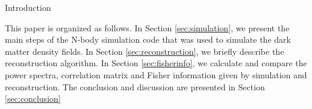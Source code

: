 \begin{section}{Introduction}

  This paper is organized as follows. 
  In Section \ref{sec:simulation}, we present the main steps of the N-body simulation code that was used to simulate the dark matter density fields.
  In Section \ref{sec:reconstruction}, we briefly describe the reconstruction algorithm.
  In Section \ref{sec:fisherinfo}, we calculate and compare the power spectra, correlation matrix and Fisher information given by simulation and reconstruction.
  The conclusion and discussion are presented in Section \ref{sec:conclusion}

\end{section}
